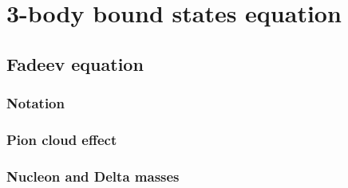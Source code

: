 \chapter{3-body bound states equation}
\label{chap:fadeev}

\section{Fadeev equation}
	\subsection{Notation}
	\subsection{Pion cloud effect}
	\subsection{Nucleon and Delta masses}